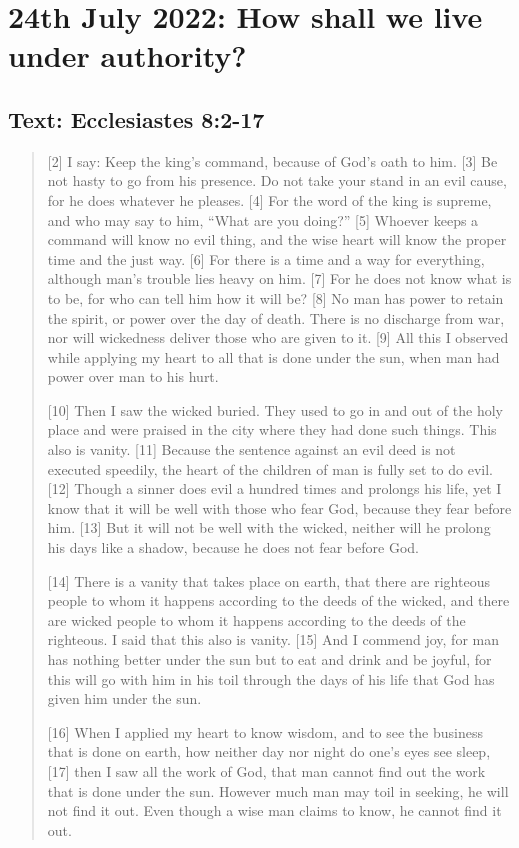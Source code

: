 \section{24th July 2022: How shall we live under authority?}
\subsection*{Text: Ecclesiastes 8:2-17}
  \begin{quote}
    [2] I say: Keep the king’s command, because of God’s oath to him.  [3] Be
    not hasty to go from his presence.  Do not take your stand in an evil
    cause, for he does whatever he pleases.  [4] For the word of the king is
    supreme, and who may say to him, “What are you doing?” [5] Whoever keeps
    a command will know no evil thing, and the wise heart will know the
    proper time and the just way.  [6] For there is a time and a way for
    everything, although man’s trouble lies heavy on him.  [7] For he does
    not know what is to be, for who can tell him how it will be?  [8] No man
    has power to retain the spirit, or power over the day of death.  There is
    no discharge from war, nor will wickedness deliver those who are given to
    it.  [9] All this I observed while applying my heart to all that is done
    under the sun, when man had power over man to his hurt.

    [10] Then I saw the wicked buried.  They used to go in and out of the
    holy place and were praised in the city where they had done such things.
    This also is vanity.  [11] Because the sentence against an evil deed is
    not executed speedily, the heart of the children of man is fully set to
    do evil.  [12] Though a sinner does evil a hundred times and prolongs his
    life, yet I know that it will be well with those who fear God, because
    they fear before him.  [13] But it will not be well with the wicked,
    neither will he prolong his days like a shadow, because he does not fear
    before God.

    [14] There is a vanity that takes place on earth, that there are
    righteous people to whom it happens according to the deeds of the wicked,
    and there are wicked people to whom it happens according to the deeds of
    the righteous.  I said that this also is vanity.  [15] And I commend joy,
    for man has nothing better under the sun but to eat and drink and be
    joyful, for this will go with him in his toil through the days of his
    life that God has given him under the sun.

    [16] When I applied my heart to know wisdom, and to see the business that
    is done on earth, how neither day nor night do one’s eyes see sleep, [17]
    then I saw all the work of God, that man cannot find out the work that is
    done under the sun.  However much man may toil in seeking, he will not
    find it out.  Even though a wise man claims to know, he cannot find it
    out.
  \end{quote}
